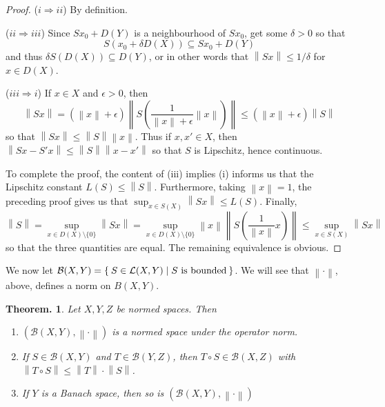\documentclass[11pt, a4paper]{memoir}
\newcommand{\imp}[2]{($#1\Rightarrow#2$)\hspace{0.2cm}}
\newcommand{\norm}[1]{\ensuremath{\left\lVert#1\right\rVert}}
\theoremstyle{change}
\newtheorem{theorem}{Theorem.}[section]
\theoremstyle{plain}
\theoremstyle{nonumberplain}
\newtheorem{proof}{Proof}
\numberwithin{equation}{section}
\begin{document}
\begin{proof}
    \imp{i}{ii}
    By definition.

    \imp{ii}{iii}
    Since $Sx_0+D(Y)$ is a neighbourhood of $Sx_0$, get some $\delta>0$ so that
    \begin{equation*}
        S(x_0+\delta D(X))\subseteq Sx_0+D(Y)
    \end{equation*}
    and thus $\delta S(D(X))\subseteq D(Y)$, or in other words that $\norm{Sx}\leq 1/\delta$ for $x\in D(X)$.

    \imp{iii}{i}
    If $x\in X$ and $\epsilon>0$, then
    \begin{equation*}
        \norm{Sx} = (\norm{x}+\epsilon)\norm{S\left(\frac{1}{\norm{x}+\epsilon}\norm{x}\right)}\leq(\norm{x}+\epsilon){\norm{S}}
    \end{equation*}
    so that $\norm{Sx}\leq\norm{S}\norm{x}$.
    Thus if $x,x'\in X$, then $\norm{Sx-S'x}\leq\norm{S}\norm{x-x'}$ so that $S$ is Lipschitz, hence continuous.

    To complete the proof, the content of (iii) implies (i) informs us that the Lipschitz constant $L(S)\leq\norm{S}$.
    Furthermore, taking $\norm{x}=1$, the preceding proof gives us that $\sup_{x\in S(X)}\norm{Sx}\leq L(S)$.
    Finally,
    \begin{equation*}
        \norm{S} = \sup_{x\in D(X)\setminus\{0\}}\norm{Sx}=\sup_{x\in D(X)\setminus\{0\}}\norm{x}\norm{S\left(\frac{1}{\norm{x}}x\right)}\leq\sup_{x\in S(X)}\norm{Sx}
    \end{equation*}
    so that the three quantities are equal.
    The remaining equivalence is obvious.
\end{proof}
We now let $\mathcal{B}(X,Y)=\Set{S\in\mathcal{L}(X,Y) | S\text{ is bounded}}$.
We will see that $\norm{\cdot}$, above, defines a norm on $B(X,Y)$.
\begin{theorem}\label{t:onorm}
    Let $X,Y,Z$ be normed spaces.
    Then
    \begin{enumerate}[nl,r]
        \item $(\mathcal{B}(X,Y),\norm{\cdot})$ is a normed space under the operator norm.
        \item If $S\in\mathcal{B}(X,Y)$ and $T\in\mathcal{B}(Y,Z)$, then $T\circ S\in\mathcal{B}(X,Z)$ with $\norm{T\circ S}\leq\norm{T}\cdot\norm{S}$.
        \item If $Y$ is a Banach space, then so is $(\mathcal{B}(X,Y),\norm{\cdot})$
    \end{enumerate}
\end{theorem}
\end{document}
